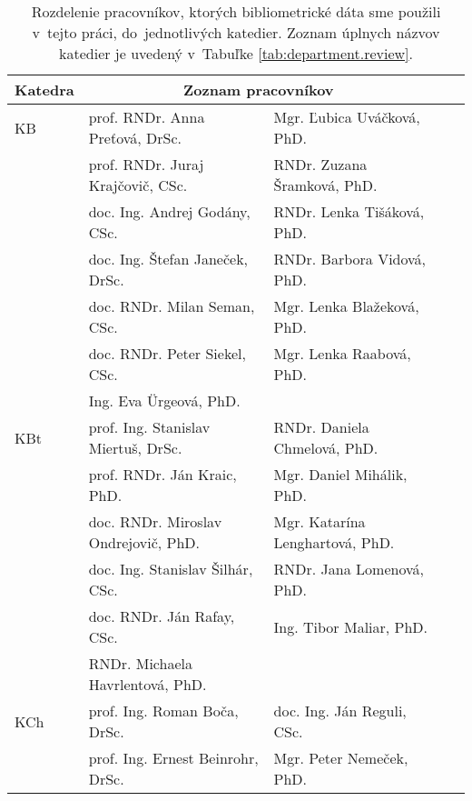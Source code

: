 \begin{table}
  \centering\small
  \caption[Rozdelenie pracovníkov do jednotlivých katedier]%
  {Rozdelenie pracovníkov, ktorých bibliometrické dáta sme použili v~tejto
    práci, do~jednotlivých katedier. Zoznam úplnych názvov katedier je
    uvedený v~Tabuľke \ref{tab:department.review}.}
  \label{tab:staff.list}
  \begin{tabularx}{\textwidth}{lllll}
    \toprule\noalign{\vspace{.3ex}}
    Katedra & \multicolumn{2}{c}{Zoznam pracovníkov} \\[0.3ex]
    \midrule\noalign{\vspace{.5ex}}
    KB   & prof. RNDr. Anna Preťová, DrSc.            & Mgr. Ľubica Uváčková, PhD.        \\
         & prof. RNDr. Juraj Krajčovič, CSc.          & RNDr. Zuzana Šramková, PhD.       \\
         & doc. Ing. Andrej Godány, CSc.              & RNDr. Lenka Tišáková, PhD.        \\
         & doc. Ing. Štefan Janeček, DrSc.            & RNDr. Barbora Vidová, PhD.        \\
         & doc. RNDr. Milan Seman, CSc.               & Mgr. Lenka Blažeková, PhD.        \\
         & doc. RNDr. Peter Siekel, CSc.              & Mgr. Lenka Raabová, PhD.          \\
         & Ing. Eva Ürgeová, PhD.                     &                                   \\[2ex]
    KBt  & prof. Ing. Stanislav Miertuš, DrSc.        & RNDr. Daniela Chmelová, PhD.      \\
         & prof. RNDr. Ján Kraic, PhD.                & Mgr. Daniel Mihálik, PhD.         \\
         & doc. RNDr. Miroslav Ondrejovič, PhD.       & Mgr. Katarína Lenghartová, PhD.   \\
         & doc. Ing. Stanislav Šilhár, CSc.           & RNDr. Jana Lomenová, PhD.         \\
         & doc. RNDr. Ján Rafay, CSc.                 & Ing. Tibor Maliar, PhD.           \\
         & RNDr. Michaela Havrlentová, PhD.           &                                   \\[2ex]
    KCh  & prof. Ing. Roman Boča, DrSc.               & doc. Ing. Ján Reguli, CSc.        \\
         & prof. Ing. Ernest Beinrohr, DrSc.          & Mgr. Peter Nemeček, PhD.          \\

\end{tabularx}
\end{table}
